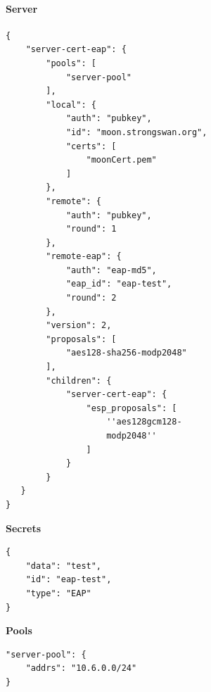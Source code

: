 \begin{minipage}[t]{0.5\textwidth}
\vspace{0pt}
\paragraph{Server}\mbox{}\medskip
\begin{lstlisting}[style=BashInputStyle]
{
    "server-cert-eap": {
        "pools": [
            "server-pool"
        ],
        "local": {
            "auth": "pubkey",
            "id": "moon.strongswan.org",
            "certs": [
                "moonCert.pem"
            ]
        },
        "remote": {
            "auth": "pubkey",
            "round": 1
        },
        "remote-eap": {
            "auth": "eap-md5",
            "eap_id": "eap-test",
            "round": 2
        },
        "version": 2,
        "proposals": [
            "aes128-sha256-modp2048"
        ],
        "children": {
            "server-cert-eap": {
                "esp_proposals": [
                    ''aes128gcm128-
                    modp2048''
                ]
            }
        }
   }
}
\end{lstlisting}
\hspace*{18pt}\textbf{Secrets}\mbox{}\medskip
\begin{lstlisting}[style=BashInputStyle]
{   
    "data": "test",
    "id": "eap-test",
    "type": "EAP"   
}
\end{lstlisting}
\hspace*{18pt}\textbf{Pools}\mbox{}\medskip
\begin{lstlisting}[style=BashInputStyle]
"server-pool": {
    "addrs": "10.6.0.0/24"
}
\end{lstlisting}
\end{minipage}
\nolinebreak
\nopagebreak